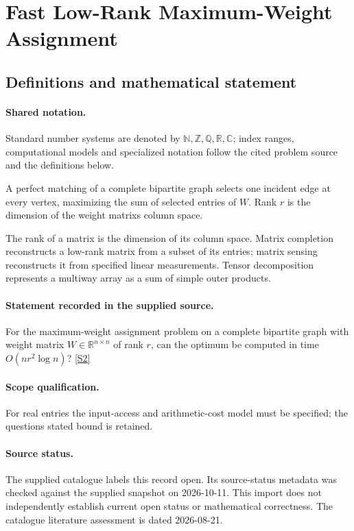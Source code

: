 \documentclass[11pt]{article}
\newcommand{\sref}[2]{\hyperlink{source:#1:#2}{[S#2]}}
\begin{document}
\section{Fast Low-Rank Maximum-Weight Assignment}\label{statement}

\subsection{Definitions and mathematical statement}

\paragraph{Shared notation.}Standard number systems are denoted by $\mathbb N,\mathbb Z,\mathbb Q,\mathbb R,\mathbb C$; index ranges, computational models and specialized notation follow the cited problem source and the definitions below.


A perfect matching of a complete bipartite graph selects one incident edge at every vertex, maximizing the sum of selected entries of $W$. Rank $r$ is the dimension of the weight matrix\textquotesingle s column space.

The rank of a matrix is the dimension of its column space. Matrix completion reconstructs a low-rank matrix from a subset of its entries; matrix sensing reconstructs it from specified linear measurements. Tensor decomposition represents a multiway array as a sum of simple outer products.
\paragraph{Statement recorded in the supplied source.}
For the maximum-weight assignment problem on a complete bipartite graph with weight matrix $W\in\mathbb R^{n\times n}$ of rank $r$, can the optimum be computed in time $O(nr^2\log n)$? \sref{statement}{2}
\paragraph{Scope qualification.}
For real entries the input-access and arithmetic-cost model must be specified; the question\textquotesingle s stated bound is retained.
\paragraph{Source status.}
The supplied catalogue labels this record open. Its source-status metadata was checked against the supplied snapshot on 2026-10-11. This import does not independently establish current open status or mathematical correctness. The catalogue literature assessment is dated 2026-08-21.
\end{document}
